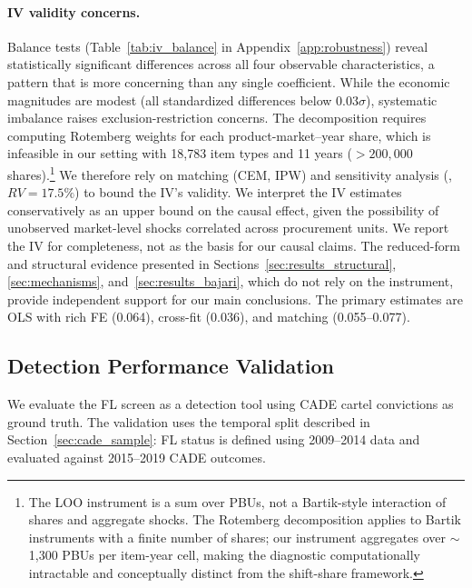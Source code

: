 \paragraph{IV validity concerns.} %
Balance tests (Table~\ref{tab:iv_balance} in
Appendix~\ref{app:robustness}) reveal statistically significant
differences across all four observable characteristics, a pattern that
is more concerning than any single coefficient. While the economic
magnitudes are modest (all standardized differences below
$0.03\sigma$), systematic imbalance raises exclusion-restriction
concerns. The \citet{goldsmithpinkham2020bartik} decomposition
requires computing Rotemberg weights for each product-market--year
share, which is infeasible in our setting with 18,783 item types and
11 years ($> 200{,}000$ shares).\footnote{The LOO instrument is a
sum over PBUs, not a Bartik-style interaction of shares and aggregate
shocks. The Rotemberg decomposition applies to Bartik instruments
with a finite number of shares; our instrument aggregates over
$\sim$1,300 PBUs per item-year cell, making the diagnostic
computationally intractable and conceptually distinct from the
shift-share framework.} We therefore rely on matching (CEM, IPW) and
sensitivity analysis (\citealt{cinelli2020making}, $RV = 17.5\%$) to
bound the IV's validity. %
We interpret the IV estimates conservatively as an upper bound on the
causal effect, given the possibility of unobserved market-level shocks
correlated across procurement units. We report the IV for completeness,
not as the basis for our causal claims. The reduced-form and structural
evidence presented in Sections~\ref{sec:results_structural},
\ref{sec:mechanisms}, and~\ref{sec:results_bajari}, which do not rely on
the instrument, provide independent support for our main conclusions. The
primary estimates are OLS with rich FE (0.064), cross-fit (0.036), and
matching (0.055--0.077).


\subsection{Detection Performance Validation}
\label{sec:detection_validation}

We evaluate the FL screen as a detection tool using CADE cartel
convictions as ground truth. The validation uses the temporal split
described in Section~\ref{sec:cade_sample}: FL status is defined using
2009--2014 data and evaluated against 2015--2019 CADE outcomes.


